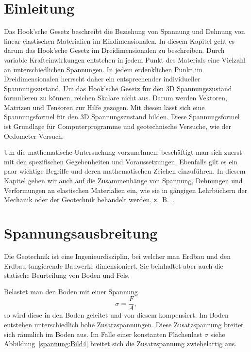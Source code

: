 \section{Einleitung\label{spannung:section:Einleitung}}
Das Hook'sche Gesetz beschreibt die Beziehung von Spannung und Dehnung von linear-elastischen Materialien im Eindimensionalen.
In diesem Kapitel geht es darum das Hook'sche Gesetz im Dreidimensionalen zu beschreiben.
Durch variable Krafteinwirkungen entstehen in jedem Punkt des Materials eine Vielzahl an unterschiedlichen Spannungen.
In jedem erdenklichen Punkt im Dreidimensionalen herrscht daher ein entsprechender individueller Spannungszustand.
Um das Hook'sche Gesetz für den 3D Spannungszustand formulieren zu können, reichen Skalare nicht aus.
Darum werden Vektoren, Matrizen und Tensoren zur Hilfe gezogen.
Mit diesen lässt sich eine Spannungsformel für den 3D Spannungszustand bilden.
Diese Spannungsformel ist Grundlage für Computerprogramme und geotechnische Versuche, wie der Oedometer-Versuch.

Um die mathematische Untersuchung vorzunehmen, beschäftigt man sich zuerst mit den spezifischen Gegebenheiten und Voraussetzungen.
Ebenfalls gilt es ein paar wichtige Begriffe und deren mathematischen Zeichen einzuführen.
In diesem Kapitel gehen wir auch auf die Zusammenhänge von Spannung, Dehnungen und Verformungen an elastischen Materialien ein,
wie sie in gängigen Lehrbüchern der Mechanik oder der Geotechnik behandelt werden, z.~B.~\cite{spannung:Grundlagen-der-Geotechnik}.

\section{Spannungsausbreitung\label{spannung:section:Spannungsausbreitung}}
Die Geotechnik ist eine Ingenieurdisziplin, bei welcher man Erdbau und den Erdbau tangierende Bauwerke dimensioniert.
Sie beinhaltet aber auch die statische Beurteilung von Boden und Fels.

Belastet man den Boden mit einer Spannung
\[
\sigma
=
\frac{F}{A}
,
\]
so wird diese in den Boden geleitet und von diesem kompensiert.
Im Boden entstehen unterschiedlich hohe Zusatzspannungen.
Diese Zusatzspannung breitet sich räumlich im Boden aus.
Im Falle einer konstanten Flächenlast $\sigma$ siehe Abbildung~\ref{spannung:Bild4} breitet sich die Zusatzspannung zwiebelartig aus.

